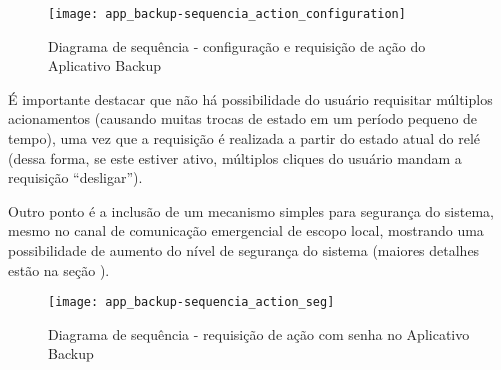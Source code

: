 \begin{figure}[H]
	\centering
	\caption{Diagrama de sequência - configuração e requisição de ação do Aplicativo Backup}
	\texttt{[image: app\_backup-sequencia\_action\_configuration]}
	\label{fig:app_backup-sequencia_action_configuration}
\end{figure}

É importante destacar que não há possibilidade do usuário requisitar múltiplos acionamentos (causando muitas trocas de estado em um período pequeno de tempo), uma vez que a requisição é realizada a partir do estado atual do relé (dessa forma, se este estiver ativo, múltiplos cliques do usuário mandam a requisição ``desligar'').

Outro ponto é a inclusão de um mecanismo simples para segurança do sistema, mesmo no canal de comunicação emergencial de escopo local, mostrando uma possibilidade de aumento do nível de segurança do sistema (maiores detalhes estão na seção \label{acessomodulo}).

\begin{figure}[H]
	\centering
	\caption{Diagrama de sequência - requisição de ação com senha no Aplicativo Backup}
	\texttt{[image: app\_backup-sequencia\_action\_seg]}
	\label{fig:app_backup-sequencia_action_seg}
\end{figure}
